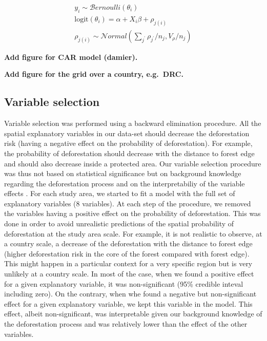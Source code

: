 \documentclass[12pt,]{article}
\begin{document}
\begin{equation}
\begin{split}
  y_i \sim \mathcal{B}ernoulli(\theta_i)\\
  \text{logit}(\theta_i) = \alpha + X_i \beta + \rho_{j(i)}\\
  \rho_{j(i)} \sim \mathcal{N}ormal(\sum_{j^{\prime}} \rho_{j^{\prime}} / n_j,V_{\rho} / n_j)
\end{split}
\label{eq:icar}
\end{equation}

\textbf{Add figure for CAR model (damier).}

\textbf{Add figure for the grid over a country, e.g.~DRC.}

\hypertarget{variable-selection}{%
\subsection{Variable selection}\label{variable-selection}}

Variable selection was performed using a backward elimination procedure. All the spatial explanatory variables in our data-set should decrease the deforestation risk (having a negative effect on the probability of deforestation). For example, the probability of deforestation should decrease with the distance to forest edge and should also decrease inside a protected area. Our variable selection procedure was thus not based on statistical significance but on background knowledge regarding the deforestation process and on the interpretabiliy of the variable effects \citep{Heinze2018}. For each study area, we started to fit a model with the full set of explanatory variables (8 variables). At each step of the procedure, we removed the variables having a positive effect on the probability of deforestation. This was done in order to avoid unrealistic predictions of the spatial probability of deforestation at the study area scale. For example, it is not realistic to observe, at a country scale, a decrease of the deforestation with the distance to forest edge (higher deforestation risk in the core of the forest compared with forest edge). This might happen in a particular context for a very specific region but is very unlikely at a country scale. In most of the case, when we found a positive effect for a given explanatory variable, it was non-significant (95\% credible inteval including zero). On the contrary, when whe found a negative but non-significant effect for a given explanatory variable, we kept this variable in the model. This effect, albeit non-significant, was interpretable given our background knowledge of the deforestation process and was relatively lower than the effect of the other variables.
\end{document}
